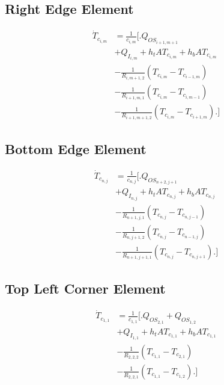 \documentclass[10pt,twocolumn]{article}
\begin{document}
\subsection{Right Edge Element}
\begin{equation}
\begin{split}
\dot{T}_{c_{i,m}}	& = \frac{1}{c_{i,m}}
					\Biggl[\Biggr.
					 	  Q_{OS_{i+1,m+1}} \\
					&	+ Q_{I_{i,m}}+ h_{t}AT_{c_{i,m}} + h_{b}AT_{c_{i,m}} \\					
					&	- \frac{1}{R_{i,m+1,2}}\left(T_{c_{i,m}}- T_{c_{i-1,m}}\right) \\
					& 	- \frac{1}{R_{i+1,m,1}}\left(T_{c_{i,m}}- T_{c_{i,m-1}}\right) \\
					& 	- \frac{1}{R_{i+1,m+1,2}}\left(T_{c_{i,m}}- T_{c_{i+1,m}}\right)
					\Biggl.\Biggr]
\end{split}
\end{equation}

\subsection{Bottom Edge Element}
\begin{equation}
\begin{split}
\dot{T}_{c_{n,j}}	& = \frac{1}{c_{n,j}}
					\Biggl[\Biggr.
					 	   Q_{OS_{n+2,j+1}} \\
					&	 + Q_{I_{n,j}}+ h_{t}AT_{c_{n,j}} + h_{b}AT_{c_{n,j}} \\
					&	- \frac{1}{R_{n+1,j,1}}\left(T_{c_{n,j}}- T_{c_{n,j-1}}\right) \\
					& 	- \frac{1}{R_{n,j+1,2}}\left(T_{c_{n,j}}- T_{c_{n-1,j}}\right) \\
					& 	- \frac{1}{R_{n+1,j+1,1}}\left(T_{c_{n,j}}- T_{c_{n,j+1}}\right)
					\Biggl.\Biggr]
\end{split}
\end{equation}

\subsection{Top Left Corner Element}
\begin{equation}
\begin{split}
\dot{T}_{c_{1,1}}	& = \frac{1}{c_{1,1}}
					\Biggl[\Biggr.
					 	  Q_{OS_{2,1}} + Q_{OS_{1,2}} \\
					& 	+ Q_{I_{1,1}}+ h_{t}AT_{c_{1,1}} + h_{b}AT_{c_{1,1}} \\
					&	- \frac{1}{R_{2,2,2}}\left(T_{c_{1,1}}- T_{c_{2,1}}\right) \\
					& 	- \frac{1}{R_{2,2,1}}\left(T_{c_{1,1}}- T_{c_{1,2}}\right)
					\Biggl.\Biggr]
\end{split}
\end{equation}
\end{document}
